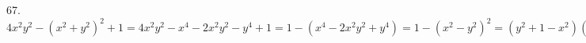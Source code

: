 67. $4x^2y^2-(x^2+y^2)^2+1=4x^2y^2-x^4-2x^2y^2-y^4+1=1-(x^4-2x^2y^2+y^4)=1-(x^2-y^2)^2=(y^2+1-x^2)(x^2-y^2+1).$\\
